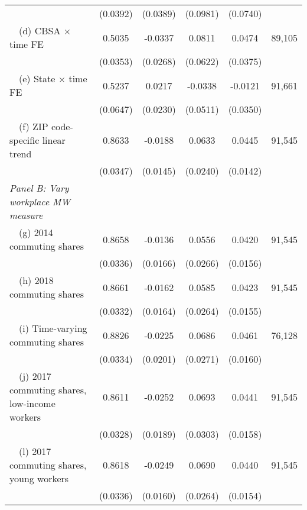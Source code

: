 \begin{landscape}
\begin{table}[ht!]
\begin{tabular}{@{}lccccc@{}}
                                                             & (0.0392) & (0.0389) & (0.0981) & (0.0740) &      \\
        $\quad$(d) CBSA $\times$ time FE                     &  0.5035  &  -0.0337  &  0.0811  &  0.0474  & 89,105 \\
                                                             & (0.0353) & (0.0268) & (0.0622) & (0.0375) &      \\
        $\quad$(e) State $\times$ time FE                    &  0.5237  &  0.0217  &  -0.0338  &  -0.0121  & 91,661 \\
                                                             & (0.0647) & (0.0230) & (0.0511) & (0.0350) &      \\
        $\quad$(f) ZIP code-specific linear trend            &  0.8633  &  -0.0188  &  0.0633  &  0.0445  & 91,545 \\
                                                             & (0.0347) & (0.0145) & (0.0240) & (0.0142) &      \\
        \textit{Panel B: Vary workplace MW measure}          &       &       &       &       &      \\
        $\quad$(g) 2014 commuting shares                     &  0.8658  &  -0.0136  &  0.0556  &  0.0420  & 91,545 \\
                                                             & (0.0336) & (0.0166) & (0.0266) & (0.0156) &      \\
        $\quad$(h) 2018 commuting shares                     &  0.8661  &  -0.0162  &  0.0585  &  0.0423  & 91,545 \\
                                                             & (0.0332) & (0.0164) & (0.0264) & (0.0155) &      \\
        $\quad$(i) Time-varying commuting shares             &  0.8826  &  -0.0225  &  0.0686  &  0.0461  & 76,128 \\
                                                             & (0.0334) & (0.0201) & (0.0271) & (0.0160) &      \\
        $\quad$(j) 2017 commuting shares, low-income workers &  0.8611  &  -0.0252  &  0.0693  &  0.0441  & 91,545 \\
                                                             & (0.0328) & (0.0189) & (0.0303) & (0.0158) &      \\
        $\quad$(l) 2017 commuting shares, young workers      &  0.8618  &  -0.0249  &  0.0690  &  0.0440  & 91,545 \\
                                                             & (0.0336) & (0.0160) & (0.0264) & (0.0154) &      \\ \bottomrule
    \end{tabular}


\end{table}
\end{landscape}
